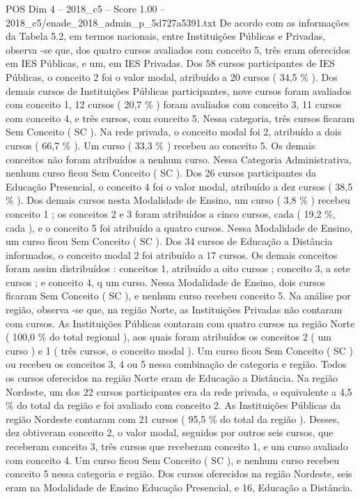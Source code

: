 \begin{textsample}{POS Dim 4 – 2018\_c5 – Score 1.00 – 2018\_c5/enade\_2018\_admin\_p\_5d727a5391.txt}
De acordo com as informações da Tabela 5.2, em termos nacionais, entre Instituições Públicas e Privadas, observa -se que, dos quatro cursos avaliados com conceito 5, três eram oferecidos em IES Públicas, e um, em IES Privadas.
Dos 58 cursos participantes de IES Públicas, o conceito 2 foi o valor modal, atribuído a 20 cursos ( 34,5 \% ).
Dos demais cursos de Instituições Públicas participantes, nove cursos foram avaliados com conceito 1, 12 cursos ( 20,7 \% ) foram avaliados com conceito 3, 11 cursos com conceito 4, e três cursos, com conceito 5.
Nessa categoria, três cursos ficaram Sem Conceito ( SC ).
Na rede privada, o conceito modal foi 2, atribuído a dois cursos ( 66,7 \% ).
Um curso ( 33,3 \% ) recebeu ao conceito 5.
Os demais conceitos não foram atribuídos a nenhum curso.
Nessa Categoria Administrativa, nenhum curso ficou Sem Conceito ( SC ).
Dos 26 cursos participantes da Educação Presencial, o conceito 4 foi o valor modal, atribuído a dez cursos ( 38,5 \% ).
Dos demais cursos nesta Modalidade de Ensino, um curso ( 3,8 \% ) recebeu conceito 1 ; os conceitos 2 e 3 foram atribuídos a cinco cursos, cada ( 19,2 \%, cada ), e o conceito 5 foi atribuído a quatro cursos.
Nessa Modalidade de Ensino, um curso ficou Sem Conceito ( SC ).
Dos 34 cursos de Educação a Distância informados, o conceito modal 2 foi atribuído a 17 cursos.
Os demais conceitos foram assim distribuídos : conceitos 1, atribuído a oito cursos ; conceito 3, a sete cursos ; e conceito 4, q um curso.
Nessa Modalidade de Ensino, dois cursos ficaram Sem Conceito ( SC ), e nenhum curso recebeu conceito 5.
Na análise por região, observa -se que, na região Norte, as Instituições Privadas não contaram com cursos.
As Instituições Públicas contaram com quatro cursos na região Norte ( 100,0 \% do total regional ), aos quais foram atribuídos os conceitos 2 ( um curso ) e 1 ( três cursos, o conceito modal ).
Um curso ficou Sem Conceito ( SC ) ou recebeu os conceitos 3, 4 ou 5 nessa combinação de categoria e região.
Todos os cursos oferecidos na região Norte eram de Educação a Distância.
Na região Nordeste, um dos 22 cursos participantes era da rede privada, o equivalente a 4,5 \% do total da região e foi avaliado com conceito 2.
As Instituições Públicas da região Nordeste contaram com 21 cursos ( 95,5 \% do total da região ).
Desses, dez obtiveram conceito 2, o valor modal, seguidos por outros seis cursos, que receberam conceito 3, três cursos que receberam conceito 1, e um curso avaliado com conceito 4.
Um curso ficou Sem Conceito ( SC ), e nenhum curso recebeu conceito 5 nessa categoria e região.
Dos cursos oferecidos na região Nordeste, seis eram na Modalidade de Ensino Educação Presencial, e 16, Educação a Distância.

\end{textsample}
